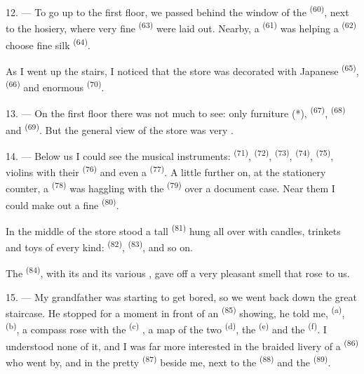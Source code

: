 12. --- To go up to the first floor, we passed behind the window of the
 \textsuperscript{(60)}, next to the hosiery, where very fine
 \textsuperscript{(63)} were laid out. Nearby, a 
\textsuperscript{(61)} was helping a  \textsuperscript{(62)} choose fine silk
 \textsuperscript{(64)}.

As I went up the stairs, I noticed that the store was decorated with Japanese
 \textsuperscript{(65)},  \textsuperscript{(66)} and
enormous  \textsuperscript{(70)}.

13. --- On the first floor there was not much to see: only furniture (*),
 \textsuperscript{(67)},  \textsuperscript{(68)} and
 \textsuperscript{(69)}. But the general view of the store was very
.

14. --- Below us I could see the musical instruments:  \textsuperscript{(71)},
 \textsuperscript{(72)},  \textsuperscript{(73)},
 \textsuperscript{(74)},  \textsuperscript{(75)}, violins with
their  \textsuperscript{(76)} and even a 
\textsuperscript{(77)}. A little further on, at the stationery counter, a 
\textsuperscript{(78)} was haggling with the  \textsuperscript{(79)}
over a document case. Near them I could make out a fine 
\textsuperscript{(80)}.

In the middle of the store stood a tall  \textsuperscript{(81)} hung
all over with candles, trinkets and toys of every kind:
 \textsuperscript{(82)},  \textsuperscript{(83)}, and so on.

The  \textsuperscript{(84)}, with its  and its various
, gave off a very pleasant smell that rose to us.

\VUsaut{3.4mm}
\VUsaut{2.8mm}

15. --- My grandfather was starting to get bored, so we went back down the great staircase. He
stopped for a moment in front of an
 \textsuperscript{(85)} showing, he told me, 
\textsuperscript{(a)},  \textsuperscript{(b)}, a
compass rose with the  \textsuperscript{(c)}
, a map of the two
 \textsuperscript{(d)}, the  \textsuperscript{(e)} and the
 \textsuperscript{(f)}. I understood none of it, and I was far
more interested in the braided livery of a  \textsuperscript{(86)} who
went by, and in the pretty  \textsuperscript{(87)} beside me, next to the
 \textsuperscript{(88)} and the  \textsuperscript{(89)}.

